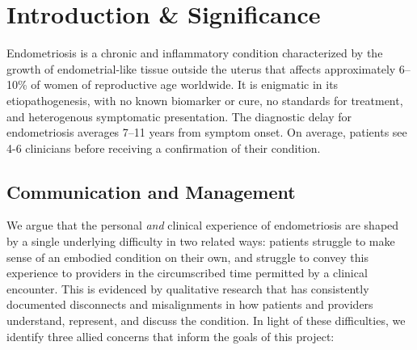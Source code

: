 \section{Introduction \& Significance}

Endometriosis is a chronic and inflammatory condition characterized by the growth of endometrial-like tissue outside the uterus\cite{Zondervan2018Endometriosis} that affects approximately 6--10\% of women of reproductive age worldwide\cite{Zondervan2018Endometriosis}. It is enigmatic in its etiopathogenesis, with no known biomarker or cure, no standards for treatment, and heterogenous symptomatic presentation\cite{Takeuchi2024Endometriosis,McKillop2019Thesis}. The diagnostic delay for endometriosis averages 7--11 years from symptom onset\cite{Agarwal2019Endometriosis,Soliman2017Endometriosis,staal2016diagnostic}. On average, patients see 4-6 clinicians before receiving a confirmation of their condition\cite{McKillop2019Thesis}.

\subsection{Communication and Management}

We argue that the personal \textit{and} clinical experience of endometriosis are shaped by a single underlying difficulty in two related ways: patients struggle to make sense of an embodied condition on their own, and struggle to convey this experience to providers in the circumscribed time permitted by a clinical encounter. This is evidenced by qualitative research that has consistently documented disconnects and misalignments in how patients and providers understand, represent, and discuss the condition\cite{Pichon2021Divided,Armour2019Endometriosis,Mardon2023EndometriosisReview,OHara2019EndometriosisReview,Denny2009Endometriosis,Young2015Endometriosis}. In light of these difficulties, we identify three allied concerns that inform the goals of this project:

